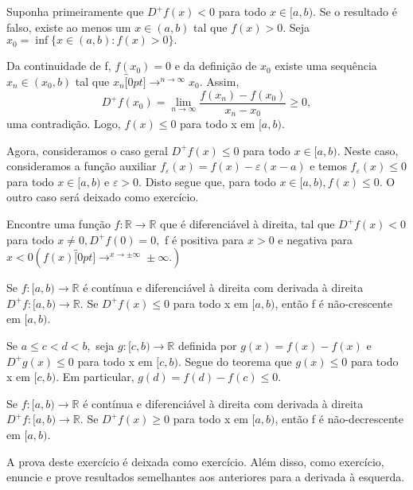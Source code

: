 \documentclass[Analysis/analysis_notes.tex]{subfiles}
\begin{document}
\begin{proof*}
	Suponha primeiramente que \(D^{+}f(x) < 0\) para todo \(x\in[a, b).\) Se o resultado
	é falso, existe ao menos um \(x\in(a, b)\) tal que \(f(x) > 0.\) Seja
	\(x_{0}=\inf\{x\in(a, b): f(x) > 0\}.\)

	Da continuidade de f, \(f(x_{0}) = 0\) e da defini\c cão de \(x_{0}\) existe
	uma sequência \(x_{n}\in(x_{0}, b)\) tal que \(x_{n}\overbracket[0pt]{\longrightarrow}^{n\to \infty}x_{0}.\)
	Assim,
	\[
		D^{+}f(x_{0}) = \lim_{n\to \infty}\frac{f(x_{n})-f(x_{0})}{x_{n}-x_{0}}\geq 0,
	\]
	uma contradi\c cão. Logo, \(f(x)\leq 0\) para todo x em \([a, b)\).

	Agora, consideramos o caso geral \(D^{+}f(x)\leq 0\) para todo \(x\in[a, b).\)
	Neste caso, consideramos a fun\c cão auxiliar \(f_{\varepsilon }(x) = f(x) - \varepsilon (x-a)\)
	e temos \(f_{\varepsilon }(x)\leq 0\) para todo \(x\in[a, b)\) e \(\varepsilon >0.\)
	Disto segue que, para todo \(x\in[a, b), f(x)\leq 0\). O outro caso será deixado como
	exercício. \qedsymbol
\end{proof*}
\begin{example}
	Encontre uma fun\c cão \(f:\mathbb{R}\rightarrow \mathbb{R}\) que é diferenciável
	à direita, tal que \(D^{+}f(x) < 0\) para todo \(x\neq0, D^{+}f(0)=0,\) f é positiva
	para \(x > 0\) e negativa para \(x < 0 (f(x)\overbracket[0pt]{\longrightarrow}^{x\to \pm\infty}\pm\infty.)\)
\end{example}
\begin{crl*}
	Se \(f:[a, b)\rightarrow \mathbb{R}\) é contínua e diferenciável à direita com derivada
	à direita \(D^{+}f:[a, b)\rightarrow \mathbb{R}.\) Se \(D^{+}f(x)\leq 0\) para todo x em \([a, b)\),
	então f é não-crescente em \([a, b).\)
\end{crl*}
\begin{proof*}
	Se \(a\leq c < d < b,\) seja \(g:[c, b)\rightarrow \mathbb{R}\) definida por
	\(g(x) = f(x) - f(x)\) e \(D^{+}g(x)\leq 0\) para todo x em \([c, b)\). Segue do
	teorema que \(g(x)\leq 0\) para todo x em \([c, b).\) Em particular, \(g(d) = f(d) - f(c)\leq 0\). \qedsymbol
\end{proof*}
\begin{crl*}
	Se \(f:[a, b)\rightarrow \mathbb{R}\) é contínua e diferenciável à direita com
	derivada à direita \(D^{+}f:[a, b)\rightarrow \mathbb{R}.\) Se \(D^{+}f(x)\geq 0\)
	para todo x em \([a, b)\), então f é não-decrescente em \([a, b).\)
\end{crl*}
A prova deste exercício é deixada como exercício. Além disso, como exercício,
enuncie e prove resultados semelhantes aos anteriores para a derivada à esquerda.
\end{document}

